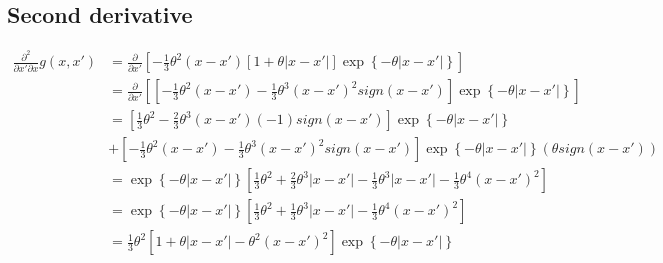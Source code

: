 \documentclass[12pt]{amsart}
\begin{document}
\subsection{Second derivative}
\begin{align}
\frac{{{\partial ^2}}}{{\partial x'\partial x}}g\left( {x,x'} \right) &= \frac{\partial }{{\partial x'}}\left[ { - \frac{1}{3}{\theta ^2}\left( {x - x'} \right)\left[ {1 + \theta \left| {x - x'} \right|} \right]\exp \left\{ { - \theta \left| {x - x'} \right|} \right\}} \right]\\
 &= \frac{\partial }{{\partial x'}}\left[ {\left[ { - \frac{1}{3}{\theta ^2}\left( {x - x'} \right) - \frac{1}{3}{\theta ^3}{{\left( {x - x'} \right)}^2}sign\left( {x - x'} \right)} \right]\exp \left\{ { - \theta \left| {x - x'} \right|} \right\}} \right]\\
 &= \left[ {\frac{1}{3}{\theta ^2} - \frac{2}{3}{\theta ^3}\left( {x - x'} \right)\left( { - 1} \right)sign\left( {x - x'} \right)} \right]\exp \left\{ { - \theta \left| {x - x'} \right|} \right\}\\
 &+ \left[ { - \frac{1}{3}{\theta ^2}\left( {x - x'} \right) - \frac{1}{3}{\theta ^3}{{\left( {x - x'} \right)}^2}sign\left( {x - x'} \right)} \right]\exp \left\{ { - \theta \left| {x - x'} \right|} \right\}\left( {\theta sign\left( {x - x'} \right)} \right)\\
 &= \exp \left\{ { - \theta \left| {x - x'} \right|} \right\}\left[ {\frac{1}{3}{\theta ^2} + \frac{2}{3}{\theta ^3}\left| {x - x'} \right| - \frac{1}{3}{\theta ^3}\left| {x - x'} \right| - \frac{1}{3}{\theta ^4}{{\left( {x - x'} \right)}^2}} \right]\\
 &= \exp \left\{ { - \theta \left| {x - x'} \right|} \right\}\left[ {\frac{1}{3}{\theta ^2} + \frac{1}{3}{\theta ^3}\left| {x - x'} \right| - \frac{1}{3}{\theta ^4}{{\left( {x - x'} \right)}^2}} \right]\\
 &= \frac{1}{3}{\theta ^2}\left[ {1 + \theta \left| {x - x'} \right| - {\theta ^2}{{\left( {x - x'} \right)}^2}} \right]\exp \left\{ { - \theta \left| {x - x'} \right|} \right\}
\end{align}


\end{document}
